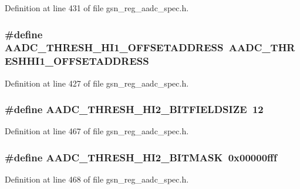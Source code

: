 Definition at line 431 of file gsn\_\-reg\_\-aadc\_\-spec.h.

\hypertarget{a00543_adc4a6b0ffdc1fe0762d354e7dc133ca3}{
\subsubsection[{AADC\_\-THRESH\_\-HI1\_\-OFFSETADDRESS}]{\setlength{\rightskip}{0pt plus 5cm}\#define AADC\_\-THRESH\_\-HI1\_\-OFFSETADDRESS~AADC\_\-THRESHHI1\_\-OFFSETADDRESS}}
\label{a00543_adc4a6b0ffdc1fe0762d354e7dc133ca3}


Definition at line 427 of file gsn\_\-reg\_\-aadc\_\-spec.h.

\hypertarget{a00543_a7310d3eec3fbad187c7687a4f3f77867}{
\subsubsection[{AADC\_\-THRESH\_\-HI2\_\-BITFIELDSIZE}]{\setlength{\rightskip}{0pt plus 5cm}\#define AADC\_\-THRESH\_\-HI2\_\-BITFIELDSIZE~12}}
\label{a00543_a7310d3eec3fbad187c7687a4f3f77867}


Definition at line 467 of file gsn\_\-reg\_\-aadc\_\-spec.h.

\hypertarget{a00543_abdeea73a4f5f9cfeb20e85fdb3872bb7}{
\subsubsection[{AADC\_\-THRESH\_\-HI2\_\-BITMASK}]{\setlength{\rightskip}{0pt plus 5cm}\#define AADC\_\-THRESH\_\-HI2\_\-BITMASK~0x00000fff}}
\label{a00543_abdeea73a4f5f9cfeb20e85fdb3872bb7}


Definition at line 468 of file gsn\_\-reg\_\-aadc\_\-spec.h.


